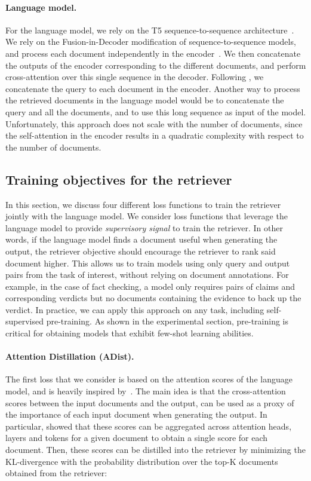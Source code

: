 \documentclass[10pt]{article} \usepackage[preprint]{tmlr}
\begin{document}
\paragraph{Language model.}
For the language model, we rely on the T5 sequence-to-sequence architecture~\citep{raffel2019exploring}.
We rely on the Fusion-in-Decoder modification of sequence-to-sequence models, and process each document independently in the encoder~\citep{izacard2020leveraging}.
We then concatenate the outputs of the encoder corresponding to the different documents, and perform cross-attention over this single sequence in the decoder.
Following \citet{izacard2020leveraging}, we concatenate the query to each document in the encoder.
Another way to process the retrieved documents in the language model would be to concatenate the query and all the documents, and to use this long sequence as input of the model.
Unfortunately, this approach does not scale with the number of documents, since the self-attention in the encoder results in a quadratic complexity with respect to the number of documents.

\subsection{Training objectives for the retriever}
\label{sec:retriever_loss}
In this section, we discuss four different loss functions to train the retriever jointly with the language model.
We consider loss functions that leverage the language model to provide \emph{supervisory signal} to train the retriever.
In other words, if the language model finds a document useful when generating the output, the retriever objective should encourage the retriever to rank said document higher.
This allows us to train models using only query and output pairs from the task of interest, without relying on document annotations.
For example, in the case of fact checking, a model only requires pairs of claims and corresponding verdicts but no documents containing the evidence to back up the verdict.
In practice, we can apply this approach on any task, including self-supervised pre-training.
As shown in the experimental section, pre-training is critical for obtaining models that exhibit few-shot learning abilities.

\paragraph{Attention Distillation (ADist).}
The first loss that we consider is based on the attention scores of the language model, and is heavily inspired by~\citet{izacard2021distilling}.
The main idea is that the cross-attention scores between the input documents and the output, can be used as a proxy of the importance of each input document when generating the output.
In particular, \citet{izacard2021distilling} showed that these scores can be aggregated across attention heads, layers and tokens for a given document to obtain a single score for each document.
Then, these scores can be distilled into the retriever by minimizing the KL-divergence with the probability distribution  over the top-K documents  obtained from the retriever:
\end{document}
